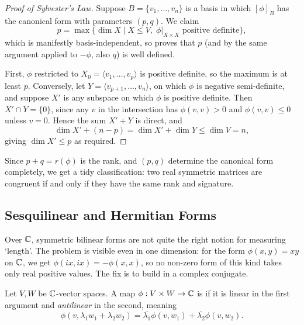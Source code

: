 \documentclass[a4paper]{scrartcl}
\begin{document}
\begin{proof}[Proof of Sylvester's Law]
    Suppose $B = \{v_1, \dots, v_n\}$ is a basis in which $[\phi]_B$ has the canonical form with parameters $(p, q)$. We claim
    $$
    p = \max \{\dim X \mid X \leq V, \; \phi|_{X \times X} \text{ positive definite}\},
    $$
    which is manifestly basis-independent, so proves that $p$ (and by the same argument applied to $-\phi$, also $q$) is well defined.

    First, $\phi$ restricted to $X_0 = \langle v_1, \dots, v_p \rangle$ is positive definite, so the maximum is at least $p$. Conversely, let $Y = \langle v_{p +1}, \dots, v_n\rangle$, on which $\phi$ is negative semi-definite, and suppose $X'$ is any subspace on which $\phi$ is positive definite. Then $X' \cap Y = \{0\}$, since any $v$ in the intersection has $\phi(v,v) > 0$ and $\phi(v,v) \leq 0$ unless $v = 0$. Hence the sum $X' + Y$ is direct, and
    $$
    \dim X' + (n - p) = \dim X' + \dim Y \leq \dim V = n,
    $$
    giving $\dim X' \leq p$ as required.
\end{proof}

\begin{remark}
    Since $p + q = r(\phi)$ is the rank, and $(p, q)$ determine the canonical form completely, we get a tidy classification: two real symmetric matrices are congruent if and only if they have the same rank and signature.
\end{remark}

\subsection{Sesquilinear and Hermitian Forms}

Over $\mathbb{C}$, symmetric bilinear forms are not quite the right notion for measuring `length'. The problem is visible even in one dimension: for the form $\phi(x, y) = xy$ on $\mathbb{C}$, we get $\phi(ix, ix) = -\phi(x,x)$, so no non-zero form of this kind takes only real positive values. The fix is to build in a complex conjugate.

\begin{definition}
    Let $V, W$ be $\mathbb{C}$-vector spaces. A map $\phi: V \times W \rightarrow \mathbb{C}$ is  if it is linear in the first argument and \emph{antilinear} in the second, meaning
    $$
    \phi(v, \lambda_1 w_1 + \lambda_2 w_2) = \overline{\lambda_1}\phi(v, w_1) + \overline{\lambda_2}\phi(v, w_2).
    $$
\end{definition}
\end{document}
